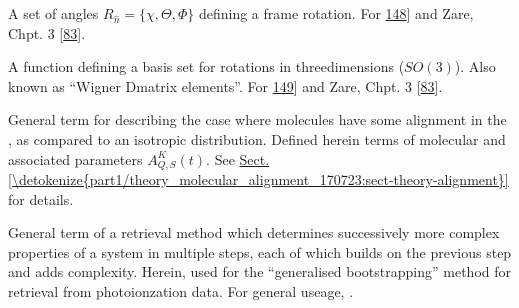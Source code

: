 \documentclass[letterpaper,table,10pt,english]{jupyterBook}
\begin{document}
\begin{description}
\sphinxAtStartPar
A set of angles \(R_{\hat{n}}=\{\chi,\Theta,\Phi\}\) defining a frame rotation. For \sphinxhref{https://en.wikipedia.org/wiki/Euler\_angles}{discussion see Wikipedia}{[}\hyperlink{cite.backmatter/bibliography:id960}{148}{]} and Zare, Chpt. 3 {[}\hyperlink{cite.backmatter/bibliography:id990}{83}{]}.

\sphinxAtStartPar
A function defining a basis set for rotations in three\sphinxhyphen{}dimensions (\(SO(3)\)). Also known as “Wigner D\sphinxhyphen{}matrix elements”. For \sphinxhref{https://en.wikipedia.org/wiki/Wigner\_D-matrix}{discussion see Wikipedia}{[}\hyperlink{cite.backmatter/bibliography:id964}{149}{]} and Zare, Chpt. 3 {[}\hyperlink{cite.backmatter/bibliography:id990}{83}{]}.

\sphinxAtStartPar
General term for describing the case where molecules have some alignment in the {\hyperref[\detokenize{backmatter/glossary:term-LF}]{}}, as compared to an isotropic distribution. Defined herein terms of molecular {\hyperref[\detokenize{backmatter/glossary:term-axis-distribution-moments}]{}} and associated parameters \(A_{Q,S}^{K}(t)\). See \hyperref[\detokenize{part1/theory_molecular_alignment_170723:sect-theory-alignment}]{Sect.\@ \ref{\detokenize{part1/theory_molecular_alignment_170723:sect-theory-alignment}}} for details.

\sphinxAtStartPar
General term of a retrieval method which determines successively more complex properties of a system in multiple steps, each of which builds on the previous step and adds complexity. Herein, used for the “generalised bootstrapping” method for {\hyperref[\detokenize{backmatter/glossary:term-radial-matrix-elements}]{}} retrieval from photoionzation data. For general useage, .

\end{description}
\end{document}
